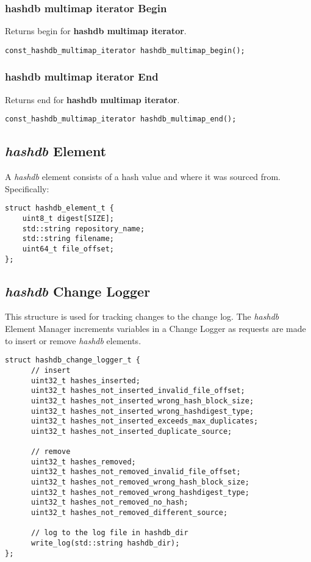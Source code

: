 \documentclass[12pt,twoside]{article}
\newcommand{\hdb}{\emph{hashdb}\xspace}
\newcommand{\hmmi}{\textbf{hashdb multimap iterator}\xspace}
\begin{document}
\subsubsection{\hmmi Begin}
Returns begin for \hmmi.

\begin{small}
\begin{verbatim}
const_hashdb_multimap_iterator hashdb_multimap_begin();
\end{verbatim}
\end{small}

\subsubsection{\hmmi End}
Returns end for \hmmi.

\begin{small}
\begin{verbatim}
const_hashdb_multimap_iterator hashdb_multimap_end();
\end{verbatim}
\end{small}

\subsection{\hdb Element}
A \hdb element consists of a hash value and where it was sourced from.
Specifically:
\begin{small}
\begin{verbatim}
struct hashdb_element_t {
    uint8_t digest[SIZE];
    std::string repository_name;
    std::string filename;
    uint64_t file_offset;
};
\end{verbatim}
\end{small}

\subsection{\hdb Change Logger}
This structure is used for tracking changes to the change log.
The \hdb Element Manager increments variables in a Change Logger
as requests are made to insert or remove \hdb elements.

\begin{small}
\begin{verbatim}
struct hashdb_change_logger_t {
      // insert
      uint32_t hashes_inserted;
      uint32_t hashes_not_inserted_invalid_file_offset;
      uint32_t hashes_not_inserted_wrong_hash_block_size;
      uint32_t hashes_not_inserted_wrong_hashdigest_type;
      uint32_t hashes_not_inserted_exceeds_max_duplicates;
      uint32_t hashes_not_inserted_duplicate_source;

      // remove
      uint32_t hashes_removed;
      uint32_t hashes_not_removed_invalid_file_offset;
      uint32_t hashes_not_removed_wrong_hash_block_size;
      uint32_t hashes_not_removed_wrong_hashdigest_type;
      uint32_t hashes_not_removed_no_hash;
      uint32_t hashes_not_removed_different_source;

      // log to the log file in hashdb_dir
      write_log(std::string hashdb_dir);
};
\end{verbatim}
\end{small}
\end{document}
